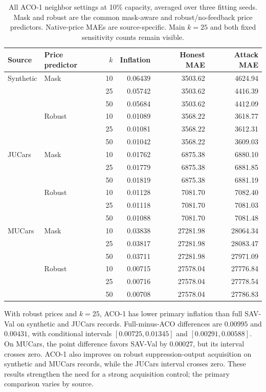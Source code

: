 \begin{table}[t]
\centering
\caption{All ACO-1 neighbor settings at 10\% capacity, averaged over three
fitting seeds. Mask and robust are the common mask-aware and robust/no-feedback
price predictors. Native-price MAEs are source-specific. Main $k=25$ and
both fixed sensitivity counts remain visible.}
\label{tab:aco_primary}
\begin{tabular}{llrrrr}
\toprule
Source & Price predictor & $k$ & Inflation & Honest MAE & Attack MAE\\
\midrule
Synthetic & Mask & 10 & 0.06439 & 3503.62 & 4624.94\\
 &  & 25 & 0.05742 & 3503.62 & 4416.39\\
 &  & 50 & 0.05684 & 3503.62 & 4412.09\\
 & Robust & 10 & 0.01089 & 3568.22 & 3618.77\\
 &  & 25 & 0.01081 & 3568.22 & 3612.31\\
 &  & 50 & 0.01042 & 3568.22 & 3609.03\\
\midrule
JUCars & Mask & 10 & 0.01762 & 6875.38 & 6880.10\\
 &  & 25 & 0.01779 & 6875.38 & 6881.85\\
 &  & 50 & 0.01819 & 6875.38 & 6881.19\\
 & Robust & 10 & 0.01128 & 7081.70 & 7082.40\\
 &  & 25 & 0.01118 & 7081.70 & 7081.03\\
 &  & 50 & 0.01088 & 7081.70 & 7081.48\\
\midrule
MUCars & Mask & 10 & 0.03838 & 27281.98 & 28064.34\\
 &  & 25 & 0.03817 & 27281.98 & 28083.47\\
 &  & 50 & 0.03711 & 27281.98 & 27971.09\\
 & Robust & 10 & 0.00715 & 27578.04 & 27776.84\\
 &  & 25 & 0.00716 & 27578.04 & 27778.54\\
 &  & 50 & 0.00708 & 27578.04 & 27786.83\\
\bottomrule
\end{tabular}
\end{table}

With robust prices and $k=25$, ACO-1 has lower primary inflation than full
SAV-Val on synthetic and JUCars records. Full-minus-ACO differences are
$0.00995$ and $0.00431$, with conditional intervals
$[0.00725,0.01345]$ and $[0.00291,0.00588]$. On MUCars, the point difference
favors SAV-Val by $0.00027$, but its interval crosses zero. ACO-1 also
improves on robust suppression-output acquisition on synthetic and MUCars
records, while the JUCars interval crosses zero. These results strengthen
the need for a strong acquisition control; the primary comparison varies by source.

